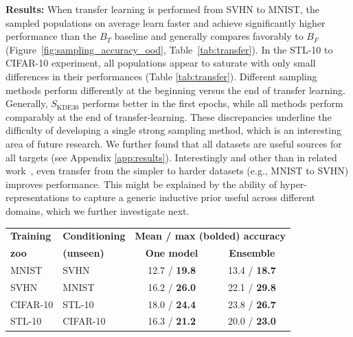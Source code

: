 \documentclass{article}
\begin{document}
\textbf{Results:}
When transfer learning is performed from SVHN to MNIST, the sampled populations on average learn faster and achieve significantly higher performance than the $B_T$ baseline and generally compares favorably to $B_F$ (Figure~\ref{fig:sampling_accuracy_ood}, Table~\ref{tab:transfer}). 
In the STL-10 to CIFAR-10 experiment, all populations appear to saturate with only small differences in their performances (Table \ref{tab:transfer}).
Different sampling methods perform differently at the beginning versus the end of transfer learning. Generally, $S_{\text{KDE30}}$ performs better in the first epochs, while all methods perform comparably at the end of transfer-learning. 
These discrepancies underline the difficulty of developing a single strong sampling method, which is an interesting area of future research.
We further found that all datasets are useful sources for all targets (see Appendix \ref{app:results}). Interestingly and other than in related work~\citep{mensinkFactorsInfluenceTransfer2021}, even transfer from the simpler to harder datasets (e.g., MNIST to SVHN) improves performance.
This might be explained by the ability of hyper-representations to capture a generic inductive prior useful across different domains, which we further investigate next.



\begin{table}
\vspace{-6mm}
\label{tab:cross_ds_recon}
\vspace{2mm}
\small
\setlength{\tabcolsep}{2pt}
\begin{tabularx}{\linewidth}{p{1.5cm}p{1.5cm}cc}
\toprule
\textbf{\scriptsize Training} & \textbf{\scriptsize Conditioning} & \multicolumn{2}{c}{\textbf{\scriptsize Mean / max (bolded) accuracy}}  \\
\textbf{\scriptsize zoo} & \textbf{\scriptsize(unseen)} & \textbf{\scriptsize One model} & \textbf{\scriptsize Ensemble} \\
\midrule
MNIST & SVHN & 12.7 / \textbf{19.8} & 13.4 / \textbf{18.7} \\
SVHN & MNIST & 16.2 / \textbf{26.0} & 22.1 / \textbf{29.8} \\
CIFAR-10 & STL-10 & 18.0 /  \textbf{24.4} & 23.8 / \textbf{26.7} \\
STL-10 & CIFAR-10 & 16.3 / \textbf{21.2} & 20.0 / \textbf{23.0} \\
\bottomrule
\end{tabularx}
\vspace{-2mm}
\end{table} 
\end{document}
